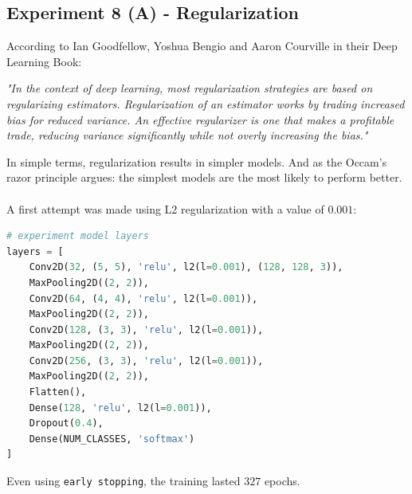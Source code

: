 \documentclass[11pt,a4paper]{article}
\begin{document}
\subsection{Experiment 8 (A) - Regularization}
According to Ian Goodfellow, Yoshua Bengio and Aaron Courville in their Deep Learning Book:
\begin{displayquote}
\textit{"In the context of deep learning, most regularization strategies are based on regularizing estimators. Regularization of an estimator works by trading increased bias for reduced variance. An eﬀective regularizer is one that makes a proﬁtable trade, reducing variance signiﬁcantly while not overly increasing the bias."}
\end{displayquote}
In simple terms, regularization results in simpler models. And as the Occam’s razor principle argues: the simplest models are the most likely to perform better.\\
\\
A first attempt was made using L2 regularization with a value of $0.001$:
\begin{lstlisting}[language=Python,frame=single]
# experiment model layers
layers = [
    Conv2D(32, (5, 5), 'relu', l2(l=0.001), (128, 128, 3)),
    MaxPooling2D((2, 2)),
    Conv2D(64, (4, 4), 'relu', l2(l=0.001)),
    MaxPooling2D((2, 2)),
    Conv2D(128, (3, 3), 'relu', l2(l=0.001)),
    MaxPooling2D((2, 2)),
    Conv2D(256, (3, 3), 'relu', l2(l=0.001)),
    MaxPooling2D((2, 2)),
    Flatten(),
    Dense(128, 'relu', l2(l=0.001)),
    Dropout(0.4),
    Dense(NUM_CLASSES, 'softmax')
]
\end{lstlisting}
Even using \texttt{early stopping}, the training lasted $327$ epochs.
\end{document}
